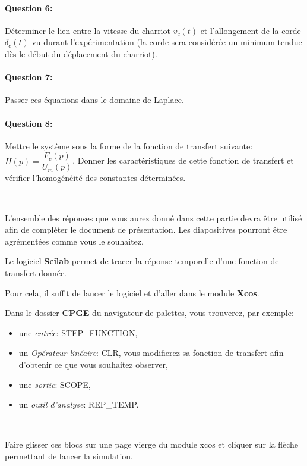 \paragraph{Question 6:} Déterminer le lien entre la vitesse du charriot $v_c(t)$ et l'allongement de la corde $\delta_c(t)$ vu durant l'expérimentation (la corde sera considérée un minimum tendue dès le début du déplacement du charriot).

\paragraph{Question 7:} Passer ces équations dans le domaine de Laplace.

\paragraph{Question 8:} Mettre le système sous la forme de la fonction de transfert suivante: $H(p)=\dfrac{F_c(p)}{U_m(p)}$. Donner les caractéristiques de cette fonction de transfert et vérifier l'homogénéité des constantes déterminées.

~\

L'ensemble des réponses que vous aurez donné dans cette partie devra être utilisé afin de compléter le document de présentation. Les diapositives pourront être agrémentées comme vous le souhaitez.

\ifdef{\public}{\cleardoublepage}{\newpage}


Le logiciel \textbf{Scilab} permet de tracer la réponse temporelle d'une fonction de transfert donnée.

Pour cela, il suffit de lancer le logiciel et d'aller dans le module \textbf{Xcos}.

Dans le dossier \textbf{CPGE} du navigateur de palettes, vous trouverez, par exemple:
\begin{itemize}
 \item une \textit{entrée}: STEP\_FUNCTION,
 \item un \textit{Opérateur linéaire}: CLR, vous modifierez sa fonction de transfert afin d'obtenir ce que vous souhaitez observer,
 \item une \textit{sortie}: SCOPE,
 \item un \textit{outil d'analyse}: REP\_TEMP.
\end{itemize}

~\

Faire glisser ces blocs sur une page vierge du module xcos et cliquer sur la flèche permettant de lancer la simulation.

